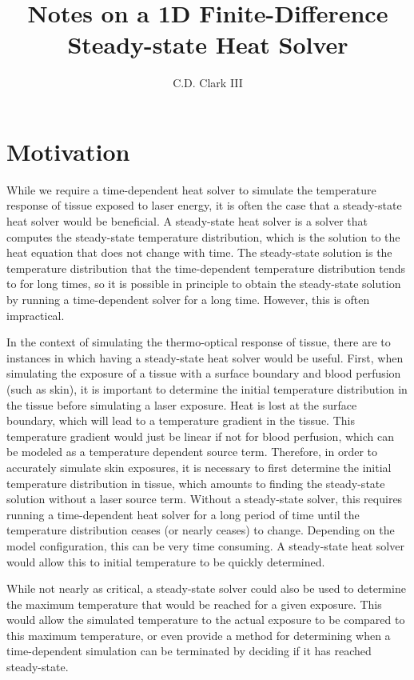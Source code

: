 \documentclass[letterpaper,12pt]{article}
\title{Notes on a 1D Finite-Difference Steady-state Heat Solver}
\author{C.D. Clark III}
\begin{document}
\maketitle

\section{Motivation}
While we require a time-dependent heat solver to simulate the temperature response of tissue exposed to laser energy, it is often the case that a steady-state heat solver would be beneficial.
A steady-state heat solver is a solver that computes the steady-state temperature distribution, which is the solution to the heat equation that does not change with time. The
steady-state solution is the temperature distribution that the time-dependent temperature distribution tends to for long times, so it is possible in principle to obtain the steady-state
solution by running a time-dependent solver for a long time. However, this is often impractical.

In the context of simulating the thermo-optical response of tissue, there are to instances in which having a steady-state heat solver would be useful. First, when simulating the exposure of a tissue
with a surface boundary and blood perfusion (such as skin), it is important to determine the initial temperature distribution in the tissue before simulating a laser exposure. Heat is lost at the surface boundary,
which will lead to a temperature gradient in the tissue. This temperature gradient would just be linear if not for
blood perfusion, which can be modeled as a temperature dependent source term. Therefore, in order to accurately simulate
skin exposures, it is necessary to first determine the initial temperature distribution in tissue, which amounts to finding
the steady-state solution without a laser source term. Without a steady-state solver, this requires running a time-dependent
heat solver for a long period of time until the temperature distribution ceases (or nearly ceases) to change. Depending on
the model configuration, this can be very time consuming. A steady-state heat solver would allow this to initial temperature
to be quickly determined.

While not nearly as critical, a steady-state solver could also be used to determine the maximum temperature that would be reached for a given exposure. This would allow the simulated temperature to the actual exposure to be compared to this maximum temperature, or even provide a method for determining when a time-dependent simulation can be terminated by deciding if it has reached steady-state.
\end{document}
